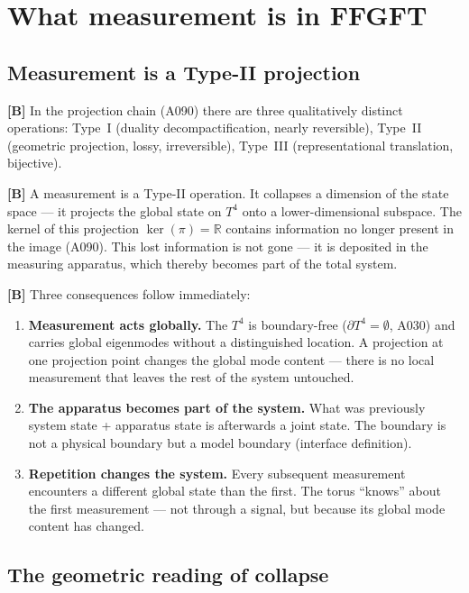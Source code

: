\section{What measurement is in FFGFT}

\subsection{Measurement is a Type-II projection}

\textbf{[B]} In the projection chain (A090) there are three qualitatively
distinct operations: Type~I (duality decompactification, nearly reversible),
Type~II (geometric projection, lossy, irreversible), Type~III
(representational translation, bijective).

\textbf{[B]} A measurement is a Type-II operation. It collapses a
dimension of the state space --- it projects the global state on $T^4$
onto a lower-dimensional subspace. The kernel of this projection
$\ker(\pi) = \mathbb{R}$ contains information no longer present in the
image (A090). This lost information is not gone --- it is deposited in
the measuring apparatus, which thereby becomes part of the total system.

\textbf{[B]} Three consequences follow immediately:

\begin{enumerate}[leftmargin=1.6em,itemsep=0.3em]
  \item \textbf{Measurement acts globally.} The $T^4$ is boundary-free
    ($\partial T^4 = \emptyset$, A030) and carries global eigenmodes
    without a distinguished location. A projection at one projection
    point changes the global mode content --- there is no local measurement
    that leaves the rest of the system untouched.
  \item \textbf{The apparatus becomes part of the system.} What was
    previously system state + apparatus state is afterwards a joint
    state. The boundary is not a physical boundary but a model boundary
    (interface definition).
  \item \textbf{Repetition changes the system.} Every subsequent
    measurement encounters a different global state than the first. The
    torus \enquote{knows} about the first measurement --- not through
    a signal, but because its global mode content has changed.
\end{enumerate}

\subsection{The geometric reading of collapse}

